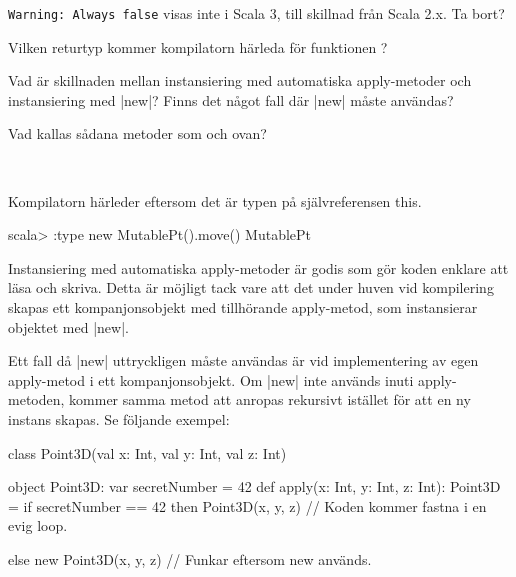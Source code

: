 \begin{ConceptConnections}

\end{ConceptConnections}

\TODO \verb|Warning: Always false| visas inte i Scala 3, till skillnad från Scala 2.x. Ta bort?

\Subtask Vilken returtyp kommer kompilatorn härleda för funktionen ?

\Subtask Vad är skillnaden mellan instansiering med automatiska apply-metoder och instansiering med \code|new|? Finns det något fall där \code|new| måste användas?

\Subtask Vad kallas sådana metoder som  och  ovan?

\SOLUTION

\TaskSolved \what~

\SubtaskSolved

\begin{ConceptConnections}

\end{ConceptConnections}


\SubtaskSolved Kompilatorn härleder  eftersom det är typen på självreferensen this.
\begin{REPL}
scala> :type new MutablePt().move()
MutablePt
\end{REPL}

\SubtaskSolved
Instansiering med automatiska apply-metoder är godis som gör koden enklare att läsa och skriva. Detta är möjligt tack vare att det under huven vid kompilering skapas ett kompanjonsobjekt med tillhörande apply-metod, som instansierar objektet med \code|new|.

Ett fall då \code|new| uttryckligen måste användas är vid implementering av egen apply-metod i ett kompanjonsobjekt. Om \code|new| inte används inuti apply-metoden, kommer samma metod att anropas rekursivt istället för att en ny instans skapas. Se följande exempel:

\begin{Code}
class Point3D(val x: Int, val y: Int, val z: Int)

object Point3D:
    var secretNumber = 42
    def apply(x: Int, y: Int, z: Int): Point3D =
        if secretNumber == 42 then
            Point3D(x, y, z) // Koden kommer fastna i en evig loop.

        else new Point3D(x, y, z) // Funkar eftersom new används.
\end{Code}



